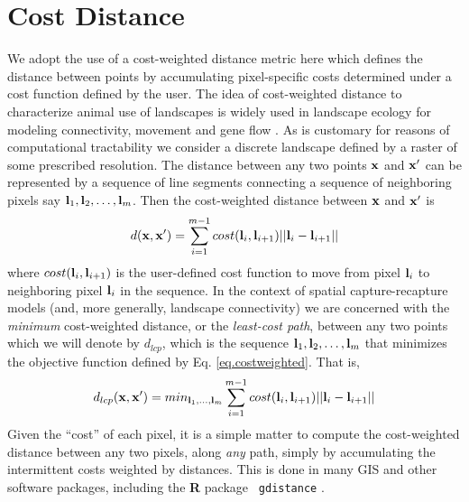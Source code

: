 \documentclass[12pt]{article}
\begin{document}
\section{Cost Distance}

We adopt the use of a cost-weighted distance metric here which
defines the
distance between points by accumulating pixel-specific costs determined under
a cost function defined by the user.
The idea of cost-weighted distance to characterize animal use of
landscapes  is widely used in
landscape ecology for modeling connectivity, movement and gene flow
\citep{adriaensen_etal:2003}. As is customary for reasons of
computational tractability we consider a discrete landscape defined by a
raster of some prescribed resolution. The distance between any two points
${\bf x}$ and ${\bf x}'$ can be represented by a sequence of line segments
connecting a sequence of neighboring  pixels say
${\bf l}_{1},{\bf l}_{2},\ldots,{\bf l}_{m}$. Then the cost-weighted distance
between ${\bf x}$ and ${\bf x}'$ is
\begin{equation}
 d({\bf x},{\bf x}')
  =  \sum_{i=1}^{m-1} cost({\bf l}_{i},{\bf l}_{i+1})||{\bf l}_{i} - {\bf l}_{i+1}||
\label{eq.costweighted}
\end{equation}
where $cost({\bf l}_{i},{\bf l}_{i+1})$ is the user-defined cost function
to move
from pixel ${\bf l}_{i}$ to neighboring pixel ${\bf l}_{i}$ in the sequence.
In the context of
spatial capture-recapture models (and, more generally, landscape
connectivity) we are concerned with the {\it minimum} cost-weighted
distance, or the {\it least-cost path}, between any two points which
we will denote by $d_{lcp}$, which is
the
sequence ${\bf l}_{1},{\bf l}_{2},\ldots,{\bf l}_{m}$ that minimizes
the objective function defined by Eq. \ref{eq.costweighted}. That is,
\begin{equation}
 d_{lcp}({\bf x},{\bf x}')
  =  min_{{\bf l}_{1},\ldots,{\bf l}_{m}}  \sum_{i=1}^{m-1} cost({\bf l}_{i},{\bf l}_{i+1})||{\bf l}_{i} - {\bf l}_{i+1}||
\label{eq.lcp}
\end{equation}
Given the ``cost'' of each pixel, it is a simple matter to compute the
cost-weighted distance between any two pixels, along {\it any} path,
simply by accumulating the intermittent costs weighted by
distances. This is done in many GIS and other software packages,
including the {\bf R} package \mbox{\tt
  gdistance} \citep{vanetten:2011}.
\end{document}
